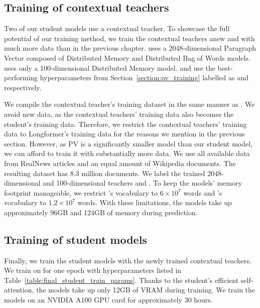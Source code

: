 \subsection{Training of contextual teachers}

Two of our student models use a contextual teacher. To showcase the full
potential of our training method, we train the contextual teachers anew and
with much more data than in the previous chapter. {\CosineStudent} uses a
2048-dimensional Paragraph Vector \citep{le2014distributed} composed of
Distributed Memory and Distributed Bag of Words models. {\MSEStudent} uses only
a 100-dimensional Distributed Memory model. {\CosineStudent} and {\MSEStudent}
use the best-performing hyperparameters from Section~\ref{section:pv_training}
labelled as  and  respectively.

We compile the contextual teacher's training dataset in the same manner as
. We avoid new data, as the contextual
teachers' training data also becomes the student's training data. Therefore, we
restrict the contextual teachers' training data to Longformer's training data for the reasons we mention in the previous section. However, as PV is a significantly
smaller model than our student model, we can afford to train it with
substantially more data. We use all available data from RealNews
articles and an equal amount of Wikipedia documents. The resulting dataset has 8.3 million documents. We label the
trained 2048-dimensional and 100-dimensional teachers  and
. To keep the models' memory footprint manageable, we restrict
's vocabulary to $6\times 10^7$ words and 's vocabulary to
$1.2\times 10^7$ words. With these limitations, the models take up approximately
96GB and 124GB of memory during prediction.

\subsection{Training of student models}

Finally, we train the student models with the newly trained contextual teachers.
We train on  for one epoch with hyperparameters listed in
Table~\ref{table:final_student_train_params}. Thanks to the student's efficient
self-attention, the models take up only 12GB of VRAM during training. We train
the models on an NVIDIA A100 GPU card for approximately 30 hours.

